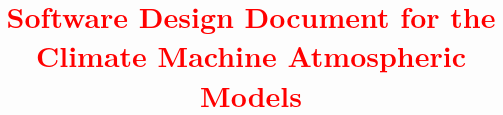 \documentclass[12pt]{article}
\begin{document}
\title{ \textcolor{red}{Software Design Document for the Climate Machine Atmospheric Models} }
\author{ }

\maketitle
\tableofcontents















%



\end{document}
